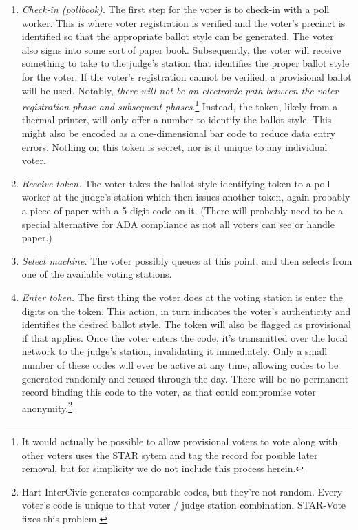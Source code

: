 \documentclass[letterpaper, 10pt, twocolumn]{article}
\newcommand{\projname}{STAR-Vote\xspace}
\begin{document}
\begin{enumerate}
\item {\em Check-in (pollbook).}
The first step for the voter is to check-in with a poll worker. This is where voter registration is verified and the voter's precinct is identified so that the appropriate ballot style can be generated. The voter also signs into some sort of paper book. Subsequently, the voter will receive something to take to the judge's station that identifies the proper ballot style for the voter. If the voter's registration cannot be verified, a provisional ballot will be used. Notably, {\em there will not be an electronic path between the voter registration phase and subsequent phases}.\footnote{
It would actually be possible to allow provisional voters to vote along with other voters uses the STAR sytem and tag the record for posible later removal, but for simplicity we do not include this process herein.}
Instead, the token, likely from a thermal printer, will only offer a number to identify the ballot style. This might also be encoded as a one-dimensional bar code to reduce data entry errors. Nothing on this token is secret, nor is it unique to any individual voter.

\item {\em Receive token.}
The voter takes the ballot-style identifying token to a poll worker at the judge's station which then issues another token, again probably a piece of paper with a 5-digit code on it. (There will probably need to be a special alternative for ADA compliance as not all voters can see or handle paper.) 

\item {\em Select machine.}
The voter possibly queues at this point, and then selects from one of the available voting stations.

\item  {\em Enter token.}
The first thing the voter does at the voting station is enter the digits on the token. 
This action, in turn indicates the voter's authenticity and identifies the desired ballot style. The token will also be flagged as provisional if that applies. 
Once the voter enters the code, it's transmitted over the local network to the judge's station, invalidating it immediately. Only a small number of these codes will ever be active at any time, allowing codes to be generated randomly and reused through the day. 
There will be no permanent record binding this code to the voter, as that could compromise voter anonymity.\footnote{Hart InterCivic generates comparable codes, but they're not random. Every voter's code is unique to that voter / judge station combination. \projname fixes this problem.}


\end{enumerate}
\end{document}
